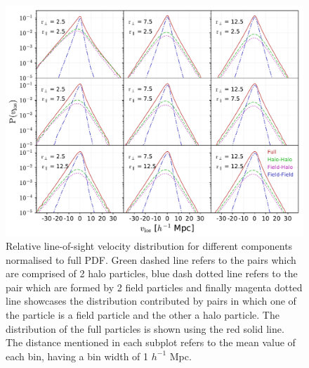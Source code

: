 \documentclass[a4paper,fleqn,usenatbib]{mnras}
\begin{document}
	
	\begin{figure}
		\centering
		\includegraphics[scale=0.8]{rel_los_components}
		\caption{Relative line-of-sight velocity distribution for different components normalised to full PDF. Green dashed line refers to the pairs which are comprised of 2 halo particles, blue dash dotted line refers to the pair which are formed by 2 field particles and finally magenta dotted line showcases the distribution contributed by pairs in which one of the particle is a field particle and the other a halo particle. The distribution of the full particles is shown using the red solid line. The distance mentioned in each subplot refers to the mean value of each bin, having a bin width of 1 $h^{-1}$ Mpc.}
		\label{fig:rel_los_comp}
	\end{figure}
	
	
	
\end{document}
